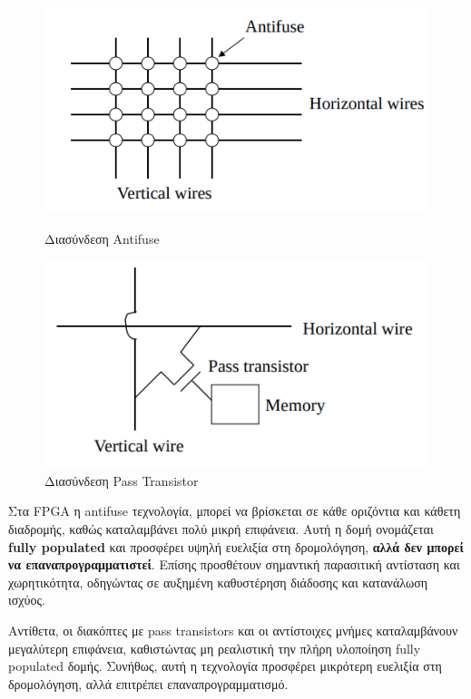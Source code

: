 \begin{figure}[h!]
  \centering
  \begin{minipage}{0.48\textwidth}
    \centering
    \includegraphics[width=\textwidth]{figures/chapter3/antifuse.png}
    \caption{Διασύνδεση Antifuse}
    \label{fig:antifuse}
  \end{minipage}\hfill
  \begin{minipage}{0.48\textwidth}
    \centering
    \includegraphics[width=\textwidth]{figures/chapter3/pass_transistor.png}
    \caption{Διασύνδεση Pass Transistor}
    \label{fig:pass_transistor}
  \end{minipage}
\end{figure}

Στα FPGA η antifuse τεχνολογία, μπορεί να βρίσκεται σε κάθε οριζόντια και κάθετη διαδρομής, καθώς καταλαμβάνει πολύ μικρή επιφάνεια. Αυτή η δομή ονομάζεται \textbf{fully populated} και προσφέρει υψηλή ευελιξία στη δρομολόγηση, \textbf{αλλά δεν μπορεί να επαναπρογραμματιστεί}. Επίσης προσθέτουν σημαντική παρασιτική αντίσταση και χωρητικότητα, οδηγώντας σε αυξημένη καθυστέρηση διάδοσης και κατανάλωση ισχύος.

Αντίθετα, οι διακόπτες με pass transistors και οι αντίστοιχες μνήμες καταλαμβάνουν μεγαλύτερη επιφάνεια, καθιστώντας μη ρεαλιστική την πλήρη υλοποίηση fully populated δομής. Συνήθως, αυτή η τεχνολογία προσφέρει μικρότερη ευελιξία στη δρομολόγηση, αλλά επιτρέπει επαναπρογραμματισμό.

